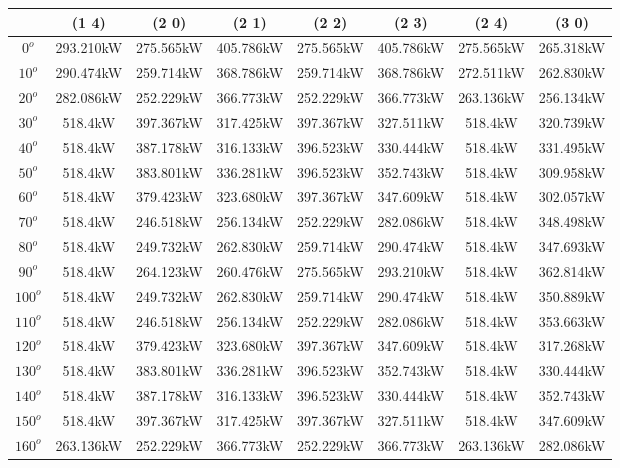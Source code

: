         \begin{table}[H]
        	\centering
        	\begin{tabular}{|c|c|c|c|c|c|c|c|} \hline
        			& (1 4)		& (2 0)		& (2 1)		& (2 2)		& (2 3)		& (2 4)		& (3 0)		\\ \hline
		$0^o$	& 293.210kW	& 275.565kW	& 405.786kW	& 275.565kW	& 405.786kW	& 275.565kW	& 265.318kW	\\ \hline
		$10^o$	& 290.474kW	& 259.714kW	& 368.786kW	& 259.714kW	& 368.786kW	& 272.511kW	& 262.830kW	\\ \hline
		$20^o$	& 282.086kW	& 252.229kW	& 366.773kW	& 252.229kW	& 366.773kW	& 263.136kW	& 256.134kW	\\ \hline
		$30^o$	& 518.4kW	& 397.367kW	& 317.425kW	& 397.367kW	& 327.511kW	& 518.4kW	& 320.739kW	\\ \hline
		$40^o$	& 518.4kW	& 387.178kW	& 316.133kW	& 396.523kW	& 330.444kW	& 518.4kW	& 331.495kW	\\ \hline
		$50^o$	& 518.4kW	& 383.801kW	& 336.281kW	& 396.523kW	& 352.743kW	& 518.4kW	& 309.958kW	\\ \hline
		$60^o$	& 518.4kW	& 379.423kW	& 323.680kW	& 397.367kW	& 347.609kW	& 518.4kW	& 302.057kW	\\ \hline
		$70^o$	& 518.4kW	& 246.518kW	& 256.134kW	& 252.229kW	& 282.086kW	& 518.4kW	& 348.498kW	\\ \hline
		$80^o$	& 518.4kW	& 249.732kW	& 262.830kW	& 259.714kW	& 290.474kW	& 518.4kW	& 347.693kW	\\ \hline
		$90^o$	& 518.4kW	& 264.123kW	& 260.476kW	& 275.565kW	& 293.210kW	& 518.4kW	& 362.814kW	\\ \hline
		$100^o$	& 518.4kW	& 249.732kW	& 262.830kW	& 259.714kW	& 290.474kW	& 518.4kW	& 350.889kW	\\ \hline
		$110^o$	& 518.4kW	& 246.518kW	& 256.134kW	& 252.229kW	& 282.086kW	& 518.4kW	& 353.663kW	\\ \hline
		$120^o$	& 518.4kW	& 379.423kW	& 323.680kW	& 397.367kW	& 347.609kW	& 518.4kW	& 317.268kW	\\ \hline
		$130^o$	& 518.4kW	& 383.801kW	& 336.281kW	& 396.523kW	& 352.743kW	& 518.4kW	& 330.444kW	\\ \hline
		$140^o$	& 518.4kW	& 387.178kW	& 316.133kW	& 396.523kW	& 330.444kW	& 518.4kW	& 352.743kW	\\ \hline
		$150^o$	& 518.4kW	& 397.367kW	& 317.425kW	& 397.367kW	& 327.511kW	& 518.4kW	& 347.609kW	\\ \hline
		$160^o$	& 263.136kW	& 252.229kW	& 366.773kW	& 252.229kW	& 366.773kW	& 263.136kW	& 282.086kW	\\ \hline

\end{tabular}
\end{table}
